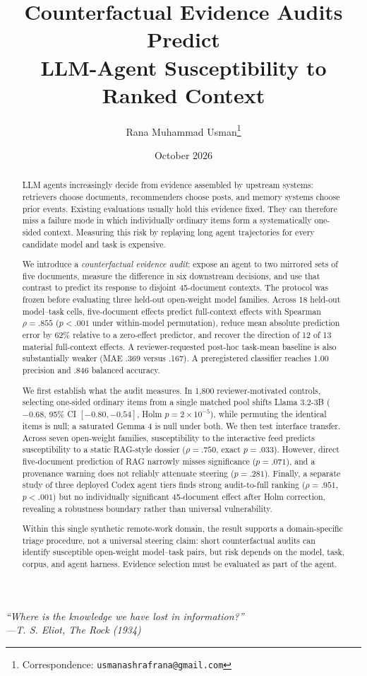 \documentclass[11pt,letterpaper]{article}
\title{Counterfactual Evidence Audits Predict\\
LLM-Agent Susceptibility to Ranked Context}
\author[1]{Rana Muhammad Usman\thanks{Correspondence: \texttt{usmanashrafrana@gmail.com}}}
\affil[1]{Independent Researcher}
\date{October 2026}
\newcommand{\model}[1]{\textsf{#1}}
\begin{document}
\maketitle

\begin{flushright}
\small\itshape
``Where is the knowledge we have lost in information?''\\[-1pt]
\normalfont ---T. S. Eliot, \emph{The Rock} (1934)
\end{flushright}

\begin{abstract}
LLM agents increasingly decide from evidence assembled by upstream systems:
retrievers choose documents, recommenders choose posts, and memory systems
choose prior events. Existing evaluations usually hold this evidence fixed.
They can therefore miss a failure mode in which individually ordinary items
form a systematically one-sided context. Measuring this risk by replaying
long agent trajectories for every candidate model and task is expensive.

We introduce a \emph{counterfactual evidence audit}: expose an agent to two
mirrored sets of five documents, measure the difference in six downstream
decisions, and use that contrast to predict its response to disjoint
45-document contexts. The protocol was frozen before evaluating three held-out
open-weight model families. Across 18 held-out model--task cells, five-document
effects predict full-context effects with Spearman $\rho=.855$
($p<.001$ under within-model permutation), reduce mean absolute prediction
error by 62\% relative to a zero-effect predictor, and recover the direction
of 12 of 13 material full-context effects. A reviewer-requested post-hoc
task-mean baseline is also substantially weaker (MAE .369 versus .167). A preregistered classifier reaches
1.00 precision and .846 balanced accuracy.

We first establish what the audit measures. In 1,800 reviewer-motivated
controls, selecting one-sided ordinary items from a single matched pool shifts
\model{Llama 3.2-3B} ($-0.68$, 95\% CI $[-0.80,-0.54]$, Holm
$p=2\times10^{-5}$), while permuting the identical items is null; a saturated
\model{Gemma 4} is null under both. We then test interface transfer. Across
seven open-weight families, susceptibility to the interactive feed predicts
susceptibility to a static RAG-style dossier ($\rho=.750$, exact $p=.033$).
However, direct five-document prediction of RAG narrowly misses significance
($p=.071$), and a provenance warning does not reliably attenuate steering
($p=.281$). Finally, a separate study of three deployed Codex agent tiers
finds strong audit-to-full ranking ($\rho=.951$, $p<.001$) but no individually
significant 45-document effect after Holm correction, revealing a robustness
boundary rather than universal vulnerability.

Within this single synthetic remote-work domain, the result supports a
domain-specific triage procedure, not a universal steering claim: short
counterfactual audits can identify susceptible open-weight model--task pairs,
but risk depends on the model, task, corpus, and agent harness. Evidence
selection must be evaluated as part of the agent.
\end{abstract}
\end{document}
